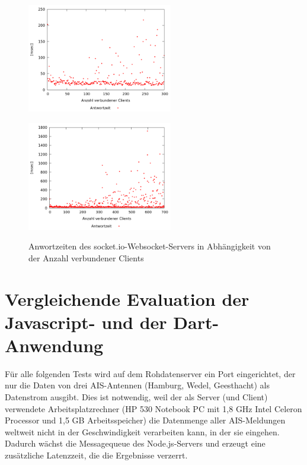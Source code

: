 \begin{figure}[H]
\begin{minipage}[hbt]{3in}
	\centering
	\includegraphics[width=2.5in]{images/stresstest300.png}
	\label{Stresstest300}
\end{minipage}
\hfill
\begin{minipage}[hbt]{3in}
	\centering
	\includegraphics[width=2.5in]{images/stresstest.png}
	\label{Stresstest}
\end{minipage}
\caption{Anwortzeiten des socket.io-Websocket-Servers in Abhängigkeit von der Anzahl verbundener Clients}
\label{Antwortzeiten socket.io}
\end{figure}
\section{Vergleichende Evaluation der Javascript- und der Dart-Anwendung}
Für alle folgenden Tests wird auf dem Rohdatenserver ein Port eingerichtet, der nur die Daten von drei AIS-Antennen (Hamburg, Wedel, Geesthacht) als Datenstrom ausgibt. Dies ist notwendig, weil der als Server (und Client) verwendete Arbeitsplatzrechner (HP 530 Notebook PC mit 1,8 GHz Intel Celeron Processor und 1,5 GB Arbeitsspeicher) die Datenmenge aller AIS-Meldungen weltweit nicht in der Geschwindigkeit verarbeiten kann, in der sie eingehen. Dadurch wächst die Messagequeue des Node.js-Servers und erzeugt eine zusätzliche Latenzzeit, die die Ergebnisse verzerrt.

